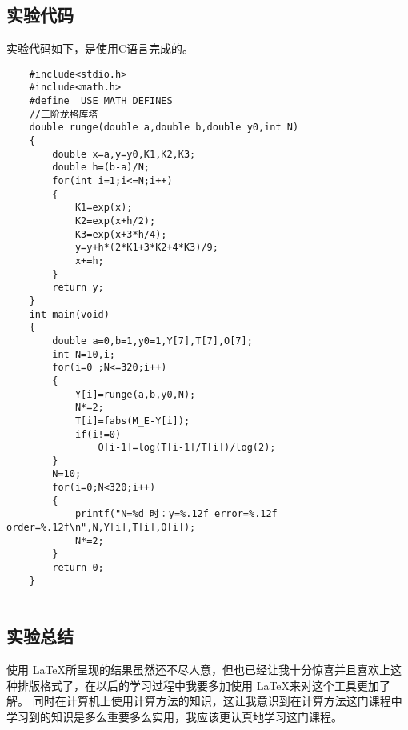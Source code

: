 \documentclass[UTF8]{ctexart}
\begin{document}
\subsection{实验代码}
实验代码如下，是使用C语言完成的。
\lstset{language=C}
\begin{lstlisting}
    #include<stdio.h>
    #include<math.h>
    #define _USE_MATH_DEFINES
    //三阶龙格库塔
    double runge(double a,double b,double y0,int N)
    {
        double x=a,y=y0,K1,K2,K3;
        double h=(b-a)/N;
        for(int i=1;i<=N;i++)
        {
            K1=exp(x);
            K2=exp(x+h/2);
            K3=exp(x+3*h/4);
            y=y+h*(2*K1+3*K2+4*K3)/9;
            x+=h;
        }
        return y;
    }
    int main(void)
    {
        double a=0,b=1,y0=1,Y[7],T[7],O[7];
        int N=10,i;
        for(i=0 ;N<=320;i++)
        {
            Y[i]=runge(a,b,y0,N);
            N*=2;
            T[i]=fabs(M_E-Y[i]);
            if(i!=0)
                O[i-1]=log(T[i-1]/T[i])/log(2);
        }
        N=10;
        for(i=0;N<320;i++)
        {
            printf("N=%d 时：y=%.12f error=%.12f order=%.12f\n",N,Y[i],T[i],O[i]);
            N*=2;
        }
        return 0;
    }
    
\end{lstlisting}
\subsection{实验总结}
	使用 \LaTeX 所呈现的结果虽然还不尽人意，但也已经让我十分惊喜并且喜欢上这种排版格式了，在以后的学习过程中我要多加使用 \LaTeX 来对这个工具更加了解。
	同时在计算机上使用计算方法的知识，这让我意识到在计算方法这门课程中学习到的知识是多么重要多么实用，我应该更认真地学习这门课程。
\end{document}
